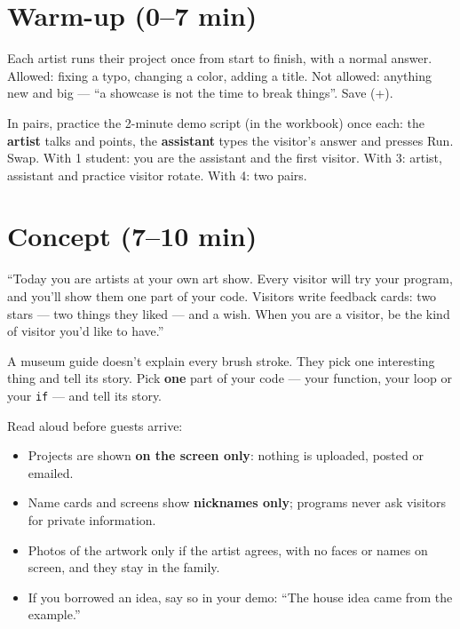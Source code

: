 \section{Warm-up (0--7 min)}
\begin{freebuild}
Each artist runs their project once from start to finish, with a normal answer. Allowed: fixing a typo, changing a color, adding a title. Not allowed: anything new and big --- \enquote{a showcase is not the time to break things}. Save (+).
\end{freebuild}
\begin{pairroles}
In pairs, practice the 2-minute demo script (in the workbook) once each: the \textbf{artist} talks and points, the \textbf{assistant} types the visitor's answer and presses Run. Swap. With 1 student: you are the assistant and the first visitor. With 3: artist, assistant and practice visitor rotate. With 4: two pairs.
\end{pairroles}

\section{Concept (7--10 min)}
\begin{teacherscript}
\enquote{Today you are artists at your own art show. Every visitor will try your program, and you'll show them one part of your code. Visitors write feedback cards: two stars --- two things they liked --- and a wish. When you are a visitor, be the kind of visitor you'd like to have.}
\end{teacherscript}
\begin{analogy}
A museum guide doesn't explain every brush stroke. They pick one interesting thing and tell its story. Pick \textbf{one} part of your code --- your function, your loop or your \texttt{if} --- and tell its story.
\end{analogy}
\begin{safety}
Read aloud before guests arrive:
\begin{itemize}[leftmargin=1.2em,itemsep=1pt]
  \item Projects are shown \textbf{on the screen only}: nothing is uploaded, posted or emailed.
  \item Name cards and screens show \textbf{nicknames only}; programs never ask visitors for private information.
  \item Photos of the artwork only if the artist agrees, with no faces or names on screen, and they stay in the family.
  \item If you borrowed an idea, say so in your demo: \enquote{The house idea came from the example.}
\end{itemize}
\end{safety}

